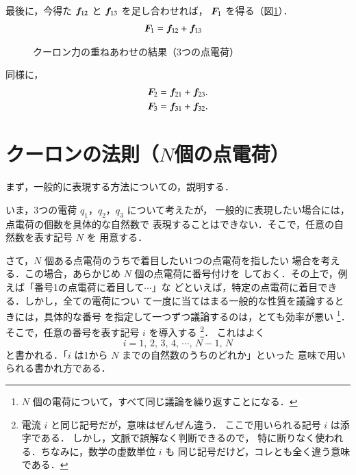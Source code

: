         最後に，今得た $\boldsymbol{f}_{12}$ と $\boldsymbol{f}_{13}$ を足し合わせれば，
        $\boldsymbol{F}_{1}$ を得る（図\ref{fig:EM_Coulomb_KasaneAwase03}）．
        \begin{align}
            \boldsymbol{F}_{1} &=  \boldsymbol{f}_{12} + \boldsymbol{f}_{13}
        \end{align}
        \begin{figure}[hbt]
            \begin{center}
                \caption{クーロン力の重ねあわせの結果（3つの点電荷）}
                \label{fig:EM_Coulomb_KasaneAwase03}
            \end{center}
        \end{figure}

        同様に，
        \begin{align*}
            \boldsymbol{F}_{2} &= \boldsymbol{f}_{21} + \boldsymbol{f}_{23}. \\
            \boldsymbol{F}_{3} &= \boldsymbol{f}_{31} + \boldsymbol{f}_{32}.
        \end{align*}


    \section{クーロンの法則（$N$個の点電荷）}
    まず，一般的に表現する方法についての，説明する．

    いま，3つの電荷 $q_{1}$，$q_{2}$，$q_{3}$ について考えたが，
    一般的に表現したい場合には，点電荷の個数を具体的な自然数で
    表現することはできない．そこで，任意の自然数を表す記号 $N$ を
    用意する．

    さて，$N$ 個ある点電荷のうちで着目したい1つの点電荷を指したい
    場合を考える．この場合，あらかじめ $N$ 個の点電荷に番号付けを
    しておく．その上で，例えば「番号1の点電荷に着目して$\cdots$」な
    どといえば，特定の点電荷に着目できる．しかし，全ての電荷につい
    て一度に当てはまる一般的な性質を議論するときには，具体的な番号
    を指定して一つずつ議論するのは，とても効率が悪い
        \footnote{
            $N$ 個の電荷について，すべて同じ議論を繰り返すことになる．
        }．
    そこで，任意の番号を表す記号 $i$ を導入する
        \footnote{
            電流 $i$ と同じ記号だが，意味はぜんぜん違う．
            ここで用いられる記号 $i$ は添字である．
            しかし，文脈で誤解なく判断できるので，
            特に断りなく使われる．ちなみに，数学の虚数単位 $i$ も
            同じ記号だけど，コレとも全く違う意味である．
        }．
    これはよく
        \begin{equation*}
            i = 1,\,2,\,3,\,4,\,\cdots,\,N-1,\,N
        \end{equation*}
    と書かれる．「$i$ は1から $N$ までの自然数のうちのどれか」といった
    意味で用いられる書かれ方である．

